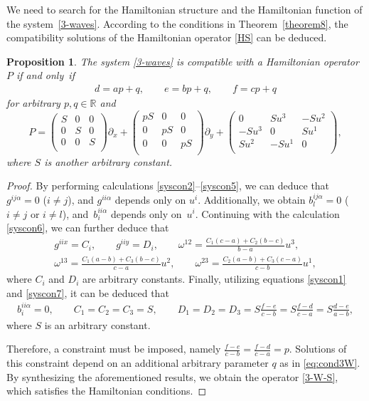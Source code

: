\documentclass[10pt,a4paper]{amsart}
\numberwithin{equation}{section}
\newtheorem{Proposition}[Theorem]{Proposition}
 { \theoremstyle{definition}
\newtheorem{Definition}[Theorem]{Definition}
\newtheorem{Note}[Theorem]{Note}
\newtheorem{Example}[Theorem]{Example}
\newtheorem{Remark}[Theorem]{Remark} }
\begin{document}
We need to search for the Hamiltonian structure and the Hamiltonian function of the system~\eqref{3-waves}. According to the conditions in Theorem~\ref{theorem8}, the compatibility solutions of the Hamiltonian operator \eqref{HS} can be deduced.
\begin{Proposition}\label{prop:3W}
The system \eqref{3-waves} is compatible with a Hamiltonian operator $P$ if and only~if%
\begin{align} \label{eq:cond3W}
d=a p + q,\qquad e=b p+q,\qquad f=cp+q
\end{align}
for arbitrary $p, q \in \mathbb{R}$ and
\begin{equation}\label{3-W-S}
P=\begin{pmatrix} S&0&0\\0&S&0\\0&0&S\\ \end{pmatrix} \partial_x+\begin{pmatrix} pS&0&0\\0&pS&0\\0&0&pS\\ \end{pmatrix} \partial_y+\begin{pmatrix} 0&Su^3&-Su^2\\-Su^3&0&Su^1\\Su^2&-Su^1&0\\ \end{pmatrix},
\end{equation}
where $S$ is another arbitrary constant.
\end{Proposition}
\begin{proof}
By performing calculations \eqref{syscon2}--\eqref{syscon5}, we can deduce that $g^{ij\alpha}=0$ ($i\neq j$), and $g^{ii\alpha}$ depends only on $u^i$. Additionally, we obtain $b^{ij\alpha}_l = 0$ ($i\neq j$ or $i\neq l$), and~$b^{ii\alpha}_i$ depends only on~$u^i$. Continuing with the calculation \eqref{syscon6}, we can further deduce that
\begin{gather*}
g^{iix}=C_i,\qquad g^{iiy}=D_i,\qquad
\omega^{12}=\frac{C_1(c-a)+C_2(b-c)}{b-a}u^3,\\
\omega^{13}=\frac{C_1(a-b)+C_3(b-c)}{c-a}u^2,\qquad
\omega^{23}=\frac{C_2(a-b)+C_3(c-a)}{c-b}u^1,
\end{gather*}
where $C_i$ and $D_i$ are arbitrary constants.
Finally, utilizing equations \eqref{syscon1} and \eqref{syscon7}, it can be deduced that
\begin{gather*}
b^{ii\alpha}_i=0,\qquad C_1=C_2=C_3=S,\qquad
D_1=D_2=D_3=S\frac{f-e}{c-b}=S\frac{f-d}{c-a}=S\frac{d-e}{a-b},
\end{gather*}
where $S$ is an arbitrary constant.

Therefore, a constraint must be imposed, namely
$
\frac{f-e}{c-b}=\frac{f-d}{c-a}=p$.
Solutions of this constraint depend on an additional arbitrary parameter $q$ as in \eqref{eq:cond3W}.
By synthesizing the aforementioned results, we obtain the operator \eqref{3-W-S}, which satisfies the Hamiltonian conditions.
\end{proof}
\end{document}
